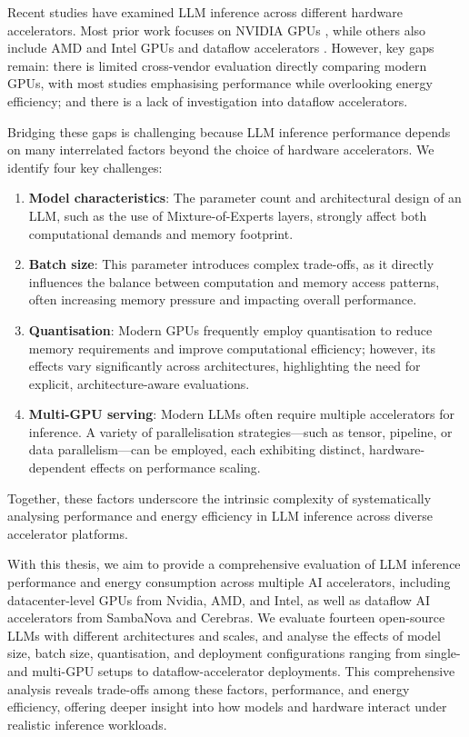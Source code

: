 Recent studies have examined LLM inference across different hardware accelerators. Most prior work focuses on NVIDIA GPUs \cite{fernandez2025energy, wilhelm2025beyond, wilkins2024offline, stojkovic2025dynamollm, maliakel2025investigating, kakolyris2024slo, stojkovic2024towards}, while others also include AMD and Intel GPUs \cite{reddi2020mlperf, LLMInfbench} and dataflow accelerators \cite{emani2024toward, Emani2022, LLMInfbench}.
However, key gaps remain: there is limited cross-vendor evaluation directly comparing modern GPUs, with most studies emphasising performance while overlooking energy efficiency; and there is a lack of investigation into dataflow accelerators.

Bridging these gaps is challenging because LLM inference performance depends on many interrelated factors beyond the choice of hardware accelerators. We identify four key challenges:

\begin{enumerate}
    \item \textbf{Model characteristics}: The parameter count and architectural design of an LLM, such as the use of Mixture-of-Experts layers, strongly affect both computational demands and memory footprint.

    \item \textbf{Batch size}: This parameter introduces complex trade-offs, as it directly influences the balance between computation and memory access patterns, often increasing memory pressure and impacting overall performance.

    \item \textbf{Quantisation}: Modern GPUs frequently employ quantisation to reduce memory requirements and improve computational efficiency; however, its effects vary significantly across architectures, highlighting the need for explicit, architecture-aware evaluations.

    \item \textbf{Multi-GPU serving}: Modern LLMs often require multiple accelerators for inference. A variety of parallelisation strategies—such as tensor, pipeline, or data parallelism—can be employed, each exhibiting distinct, hardware-dependent effects on performance scaling.
\end{enumerate}

Together, these factors underscore the intrinsic complexity of systematically analysing performance and energy efficiency in LLM inference across diverse accelerator platforms.


With this thesis, we aim to provide a comprehensive evaluation of LLM inference performance and energy consumption across multiple AI accelerators, including datacenter-level GPUs from Nvidia, AMD, and Intel, as well as dataflow AI accelerators from SambaNova and Cerebras.
We evaluate fourteen open-source LLMs with different architectures and scales, and analyse the effects of model size, batch size, quantisation, and deployment configurations ranging from single- and multi-GPU setups to dataflow-accelerator deployments. This comprehensive analysis reveals trade-offs among these factors, performance, and energy efficiency, offering deeper insight into how models and hardware interact under realistic inference workloads.